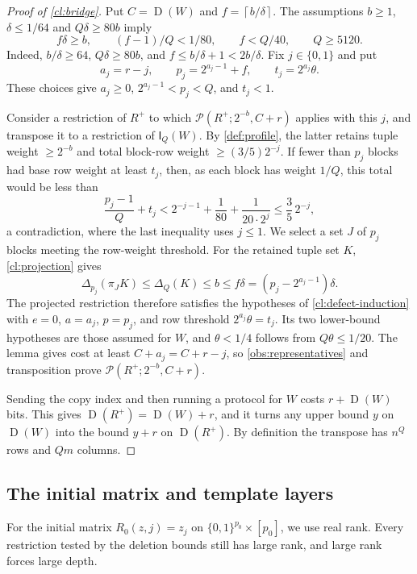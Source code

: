 \documentclass[11pt,letterpaper]{article} \usepackage[utf8]{inputenc}
\theoremstyle{plain} \newtheorem{theorem}{Theorem}[section]
\theoremstyle{definition} \newaliascnt{definition}{theorem}
\newcommand{\D}{\operatorname{D}}
\newcommand{\Int}[2]{\mathsf{I}_{#1}(#2)}
\newcommand{\RP}[3]{\mathcal{P}(#1;#2,#3)}
\newcommand{\ceil}[1]{\left\lceil#1\right\rceil}
\begin{document}
\begin{proof}[Proof of \cref{cl:bridge}]
\label{proof:cl:bridge}
Put $C=\D(W)$ and $f=\ceil{b/\delta}$. The assumptions $b\ge1$, $\delta\le1/64$ and $Q\delta\ge80b$ imply
\[
f\delta\ge b,\qquad (f-1)/Q<1/80,\qquad f<Q/40,\qquad Q\ge5120.
\]
Indeed, $b/\delta\ge64$, $Q\delta\ge80b$, and
$f\le b/\delta+1<2b/\delta$. Fix $j\in\{0,1\}$ and put
\[
a_j=r-j,\qquad p_j=2^{a_j-1}+f,\qquad t_j=2^{a_j}\theta.
\]
These choices give $a_j\ge0$, $2^{a_j-1}<p_j<Q$, and $t_j<1$.

Consider a restriction of $R^+$ to which $\RP{R^+}{2^{-b}}{C+r}$ applies with
this $j$, and transpose it to a restriction of $\Int{Q}{W}$. By
\cref{def:profile}, the latter retains tuple
weight $\ge2^{-b}$ and total block-row weight $\ge(3/5)2^{-j}$.
If fewer than $p_j$ blocks had base row weight at least $t_j$, then, as each block
has weight $1/Q$, this total would be less than
\[
\frac{p_j-1}{Q}+t_j
<2^{-j-1}+\frac1{80}+\frac1{20\cdot2^j}
\le\frac35\,2^{-j},
\]
a contradiction, where the last inequality uses $j\le1$. We select a set $J$ of $p_j$ blocks meeting the row-weight threshold. For the retained tuple set $K$, \cref{cl:projection} gives
\[
\Delta_{p_j}(\pi_JK)\le\Delta_Q(K)\le b
\le f\delta=(p_j-2^{a_j-1})\delta.
\]
The projected restriction therefore satisfies the hypotheses of
\cref{cl:defect-induction} with $e=0$, $a=a_j$, $p=p_j$, and row threshold $2^{a_j}\theta=t_j$.
Its two lower-bound hypotheses are those assumed for $W$, and $\theta<1/4$ follows from $Q\theta\le1/20$.
The lemma gives cost at least $C+a_j=C+r-j$, so \cref{obs:representatives} and
transposition prove $\RP{R^+}{2^{-b}}{C+r}$.

Sending the copy index and then running a protocol for $W$ costs
$r+\D(W)$ bits. This gives $\D(R^+)=\D(W)+r$, and it turns any
upper bound $y$ on $\D(W)$ into the bound $y+r$ on $\D(R^+)$. By definition the
transpose has $n^Q$ rows and $Qm$ columns.
\end{proof}

\subsection{The initial matrix and template layers}
\label{sec:initial-template-proofs}

For the initial matrix $R_0(z,j)=z_j$ on $\{0,1\}^{p_0}\times[p_0]$, we use
real rank. Every restriction tested by the deletion bounds still has large
rank, and large rank forces large depth.
\end{document}
